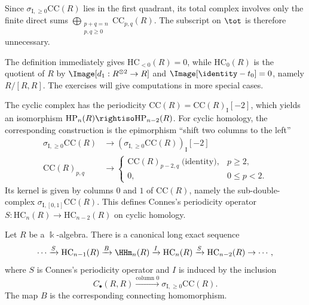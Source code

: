 Since $\sigma_{\mathrm{I},\geq0}\mathrm{CC}(R)$ lies in the first quadrant,
its total complex involves only the finite direct sums
$\bigoplus_{\substack{p+q=n\\p,q\geq0}}\mathrm{CC}_{p,q}(R)$. The subscript
on $\tot$ is therefore unnecessary.

The definition immediately gives $\mathrm{HC}_{<0}(R)=0$, while
$\mathrm{HC}_0(R)$ is the quotient of $R$ by
$\Image[d_1:R^{\otimes2}\to R]$ and $\Image[\identity-t_0]=0$, namely
$R/[R,R]$. The exercises will give computations in more special cases.

The cyclic complex has the periodicity
$\mathrm{CC}(R)=\mathrm{CC}(R)_{\mathrm{I}}[-2]$, which yields an
isomorphism $\mathrm{HP}_n(R)\rightiso\mathrm{HP}_{n-2}(R)$. For cyclic
homology, the corresponding construction is the epimorphism ``shift two
columns to the left''
\begin{align*}
	\sigma_{\mathrm{I},\geq0}\mathrm{CC}(R)
	&\to\left(\sigma_{\mathrm{I},\geq0}\mathrm{CC}(R)\right)_{\mathrm{I}}[-2]\\
	\mathrm{CC}(R)_{p,q}
	&\to\begin{cases}
		\mathrm{CC}(R)_{p-2,q}\;\text{(identity)},&p\geq2,\\
		0,&0\leq p<2.
	\end{cases}
\end{align*}
Its kernel is given by columns $0$ and $1$ of $\mathrm{CC}(R)$, namely the
sub-double-complex $\sigma_{\mathrm{I},[0,1]}\mathrm{CC}(R)$. This defines
Connes's periodicity operator
$S:\mathrm{HC}_n(R)\to\mathrm{HC}_{n-2}(R)$ on cyclic homology.

\begin{theorem}[A.\ Connes]\label{prop:Connes-exact}
	Let $R$ be a $\Bbbk$-algebra. There is a canonical long exact sequence
	\[ \cdots \xrightarrow{S} \mathrm{HC}_{n-1}(R)
		\xrightarrow{B} \HHm_n(R) \xrightarrow{I} \mathrm{HC}_n(R)
		\xrightarrow{S} \mathrm{HC}_{n-2}(R) \to \cdots, \]
	where $S$ is Connes's periodicity operator and $I$ is induced by the
	inclusion
	\[
		C_\bullet(R,R)\xrightarrow{\text{column $0$}}
		\sigma_{\mathrm{I},\geq0}\mathrm{CC}(R).
	\]
	The map $B$ is the corresponding connecting homomorphism.
\end{theorem}

